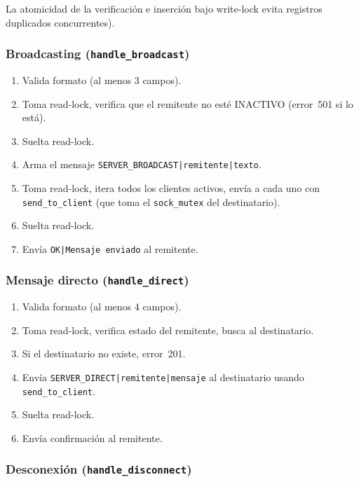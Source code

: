 \documentclass[12pt,a4paper]{article}
\begin{document}
La atomicidad de la verificación e inserción bajo write-lock evita registros
duplicados concurrentes).

\subsubsection{Broadcasting (\texttt{handle\_broadcast})}

\begin{enumerate}[nosep]
    \item Valida formato (al menos 3 campos).
    \item Toma read-lock, verifica que el remitente no esté INACTIVO (error~501 si lo está).
    \item Suelta read-lock.
    \item Arma el mensaje \texttt{SERVER\_BROADCAST|remitente|texto}.
    \item Toma read-lock, itera todos los clientes activos, envía a cada uno
          con \texttt{send\_to\_client} (que toma el \texttt{sock\_mutex} del
          destinatario).
    \item Suelta read-lock.
    \item Envía \texttt{OK|Mensaje enviado} al remitente.
\end{enumerate}

\subsubsection{Mensaje directo (\texttt{handle\_direct})}

\begin{enumerate}[nosep]
    \item Valida formato (al menos 4 campos).
    \item Toma read-lock, verifica estado del remitente, busca al destinatario.
    \item Si el destinatario no existe, error~201.
    \item Envía \texttt{SERVER\_DIRECT|remitente|mensaje} al destinatario
          usando \texttt{send\_to\_client}.
    \item Suelta read-lock.
    \item Envía confirmación al remitente.
\end{enumerate}

\subsubsection{Desconexión (\texttt{handle\_disconnect})}
\end{document}
